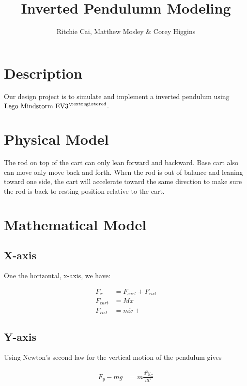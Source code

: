 \documentclass{notes}
\author{Ritchie Cai, Matthew Mosley \& Corey Higgins}
\title{Inverted Pendulumn Modeling}
\begin{document}
\maketitle 

\section{Description}
Our design project is to simulate and implement a inverted pendulum using 
$\text{Lego Mindstorm EV3}^{\textregistered}$. 

\section{Physical Model}


The rod on top of the cart can only lean forward and backward. 
Base cart also can move only move back and forth. 
When the rod is out of balance and leaning toward one side, the cart will accelerate toward the same
direction to make sure the rod is back to resting position relative to the cart.

\section{Mathematical Model}

\subsection{X-axis}
One the horizontal, x-axis, we have:

\begin{align*}
  F_x & = F_{cart} + F_{rod} \\
  F_{cart} & = M\ddot{x}  \\
  F_{rod} &  = m\ddot{x} + 
\end{align*}

\subsection{Y-axis}
Using Newton's second law for the vertical motion of the pendulum gives

\begin{align*}
  F_y - mg & = m\frac{d^2y_G}{dt^2}
  
 \end{align*}
\end{document}
